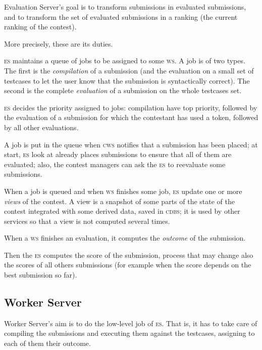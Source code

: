 \documentclass[a4paper,8pt]{amsart}
\newcommand{\CDBS}{\textsc{cdbs}}
\newcommand{\CWS}{\textsc{cws}}
\newcommand{\ES}{\textsc{es}}
\newcommand{\WS}{\textsc{ws}}
\newenvironment{squishlist}{%
  \begin{list}{\textbullet}%
    { \setlength{\itemsep}{0pt}%
      \setlength{\parsep}{3pt}%
      \setlength{\topsep}{3pt}%
      \setlength{\partopsep}{0pt}%
      \setlength{\leftmargin}{1.5em}%
      \setlength{\labelwidth}{1em}%
      \setlength{\labelsep}{0.5em} }%
}{\end{list}}
\begin{document}
\begin{multicols}{2}
  Evaluation Server's goal is to transform submissions in evaluated
  submissions, and to transform the set of evaluated submissions in a
  ranking (the current ranking of the contest).

  More precisely, these are its duties.
  \begin{squishlist}
  \item \ES{} maintains a queue of jobs to be assigned to some
    \WS{}. A job is of two types. The first is the
    \emph{compilation\/} of a submission (and the evaluation on a
    small set of testcases to let the user know that the submission is
    syntactically correct). The second is the complete
    \emph{evaluation\/} of a submission on the whole testcases set.
  \item \ES{} decides the priority assigned to jobs: compilation have
    top priority, followed by the evaluation of a submission for which
    the contestant has used a token, followed by all other
    evaluations.
  \item A job is put in the queue when \CWS{} notifies that a
    submission has been placed; at start, \ES{} look at already places
    submissions to ensure that all of them are evaluated; also, the
    contest managers can ask the \ES{} to reevaluate some submissions.
  \item When a job is queued and when \WS{} finishes some job, \ES{}
    update one or more \emph{views\/} of the contest. A view is a
    snapshot of some parts of the state of the contest integrated with
    some derived data, saved in \CDBS{}; it is used by other services
    so that a view is not computed several times.
  \item When a \WS{} finishes an evaluation, it computes the
    \emph{outcome\/} of the submission.
  \item Then the \ES{} computes the score of the submission, process
    that may change also the scores of all others submissions (for
    example when the score depends on the best submission so far).
  \end{squishlist}

  \subsection{Worker Server}

  Worker Server's aim is to do the low-level job of \ES{}. That is, it
  has to take care of compiling the submissions and executing them
  against the testcases, assigning to each of them their outcome.


\end{multicols}
\end{document}
